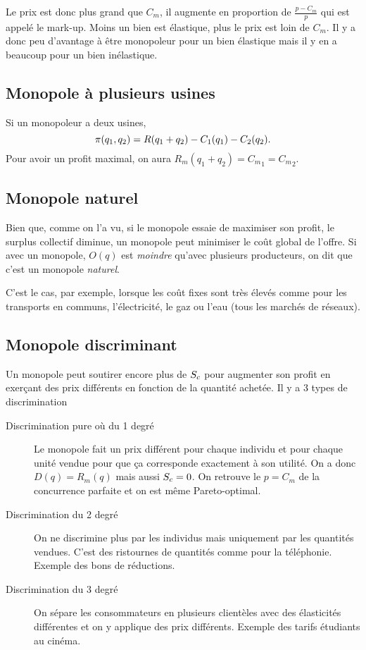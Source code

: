 Le prix est donc plus grand que $C_m$, il augmente en proportion de
$\frac{p-C_m}{p}$ qui est appelé le mark-up.
Moins un bien est élastique, plus le prix est loin de $C_m$.
Il y a donc peu d'avantage à être monopoleur pour un bien élastique
mais il y en a beaucoup pour un bien inélastique.

\subsection{Monopole à plusieurs usines}
Si un monopoleur a deux usines,
\[ \pi(q_1,q_2) = R(q_1 + q_2) - C_1(q_1) - C_2(q_2). \]
Pour avoir un profit maximal, on aura
$R_m(q_1+q_2) = {C_m}_1 = {C_m}_2$.

\subsection{Monopole naturel}
Bien que, comme on l'a vu, si le monopole essaie de maximiser
son profit, le surplus collectif diminue,
un monopole peut minimiser le coût global de l'offre.
Si avec un monopole, $O(q)$ est \emph{moindre} qu'avec plusieurs producteurs,
on dit que c'est un monopole \emph{naturel}.

C'est le cas, par exemple, lorsque les coût fixes sont très élevés comme
pour les transports en communs, l'électricité, le gaz ou l'eau
(tous les marchés de réseaux).

\subsection{Monopole discriminant}
Un monopole peut soutirer encore plus de ${S_c}$ pour augmenter
son profit en exerçant des prix différents en fonction de la quantité
achetée.
Il y a 3 types de discrimination
\begin{description}
  \item[Discrimination pure où du 1\ier{} degré]
    Le monopole fait un prix différent pour chaque individu et pour chaque
    unité vendue pour que ça corresponde exactement à son utilité.
    On a donc $D(q) = R_m(q)$ mais aussi ${S_c} = 0$.
    On retrouve le $p = C_m$ de la concurrence parfaite et on est même
    Pareto-optimal.
  \item[Discrimination du 2\ieme{} degré]
    On ne discrimine plus par les individus mais uniquement par les quantités
    vendues.
    C'est des ristournes de quantités comme pour la téléphonie.
    Exemple des bons de réductions. 
  \item[Discrimination du 3\ieme{} degré]
    On sépare les consommateurs en plusieurs clientèles avec des élasticités
    différentes et on y applique des prix différents.
    Exemple des tarifs étudiants au cinéma.
\end{description}

